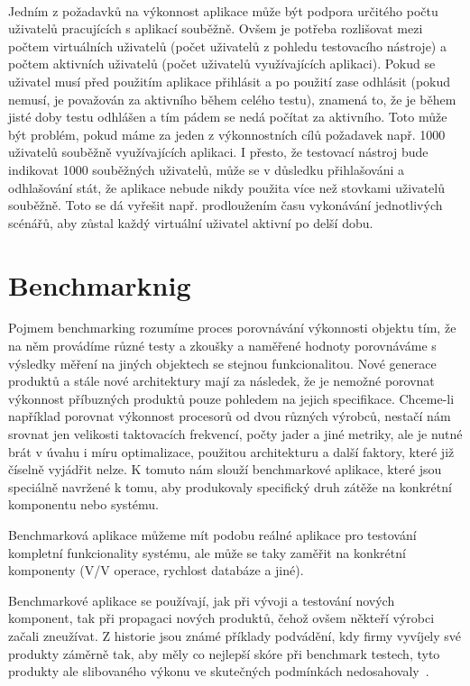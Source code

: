 \documentclass[122pt,oneside]{fithesis}
\begin{document}
\vspace{5 mm}
\\\indent Jedním z požadavků na výkonnost aplikace může být podpora určitého počtu uživatelů pracujících s aplikací souběžně. Ovšem je potřeba rozlišovat mezi počtem virtuálních uživatelů (počet uživatelů z pohledu testovacího nástroje) a počtem aktivních uživatelů (počet uživatelů využívajících aplikaci). Pokud se uživatel musí před použitím aplikace přihlásit a po použití zase odhlásit (pokud nemusí, je považován za aktivního během celého testu), znamená to, že je během jisté doby testu odhlášen a tím pádem se nedá počítat za aktivního. Toto může být problém, pokud máme za jeden z výkonnostních cílů požadavek např. 1000 uživatelů souběžně využívajících aplikaci. I přesto, že testovací nástroj bude indikovat 1000 souběžných uživatelů, může se v důsledku přihlašováni a odhlašování stát, že aplikace nebude nikdy použita více než stovkami uživatelů souběžně. Toto se dá vyřešit např. prodloužením času vykonávání jednotlivých scénářů, aby zůstal každý virtuální uživatel aktivní po delší dobu.

\chapter{Benchmarknig}

Pojmem benchmarking rozumíme proces porovnávání výkonnosti objektu tím, že na něm provádíme různé testy a zkoušky a naměřené hodnoty porovnáváme s výsledky měření na jiných objektech se stejnou funkcionalitou. Nové generace produktů a stále nové architektury mají za následek, že je nemožné porovnat výkonnost příbuzných produktů pouze pohledem na jejich specifikace. Chceme-li například porovnat výkonnost procesorů od dvou různých výrobců, nestačí nám srovnat jen velikosti taktovacích frekvencí, počty jader a jiné metriky, ale je nutné brát v úvahu i míru optimalizace, použitou architekturu a další faktory, které již číselně vyjádřit nelze. K tomuto nám slouží benchmarkové aplikace, které jsou speciálně navržené k tomu, aby produkovaly specifický druh zátěže na konkrétní komponentu nebo systému.

Benchmarková aplikace můžeme mít podobu reálné aplikace pro testování kompletní funkcionality systému, ale může se taky zaměřit na konkrétní komponenty (V/V operace, rychlost databáze a jiné).

Benchmarkové aplikace se používají, jak při vývoji a testování nových komponent, tak při propagaci nových produktů, čehož ovšem někteří výrobci začali zneužívat. Z historie jsou známé příklady podvádění, kdy firmy vyvíjely své produkty záměrně tak, aby měly co nejlepší skóre při benchmark testech, tyto produkty ale slibovaného výkonu ve skutečných podmínkách nedosahovaly~\cite{wikiBench}.
\end{document}
